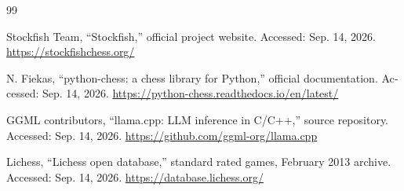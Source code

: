 \begin{thebibliography}{99}
\begin{latin}
Stockfish Team, “Stockfish,” official project website. Accessed: Sep. 14, 2026. \url{https://stockfishchess.org/}
\end{latin}
\begin{latin}
N. Fiekas, “python-chess: a chess library for Python,” official documentation. Accessed: Sep. 14, 2026. \url{https://python-chess.readthedocs.io/en/latest/}
\end{latin}
\begin{latin}
GGML contributors, “llama.cpp: LLM inference in C/C++,” source repository. Accessed: Sep. 14, 2026. \url{https://github.com/ggml-org/llama.cpp}
\end{latin}
\begin{latin}
Lichess, “Lichess open database,” standard rated games, February 2013 archive. Accessed: Sep. 14, 2026. \url{https://database.lichess.org/}
\end{latin}
\end{thebibliography}
